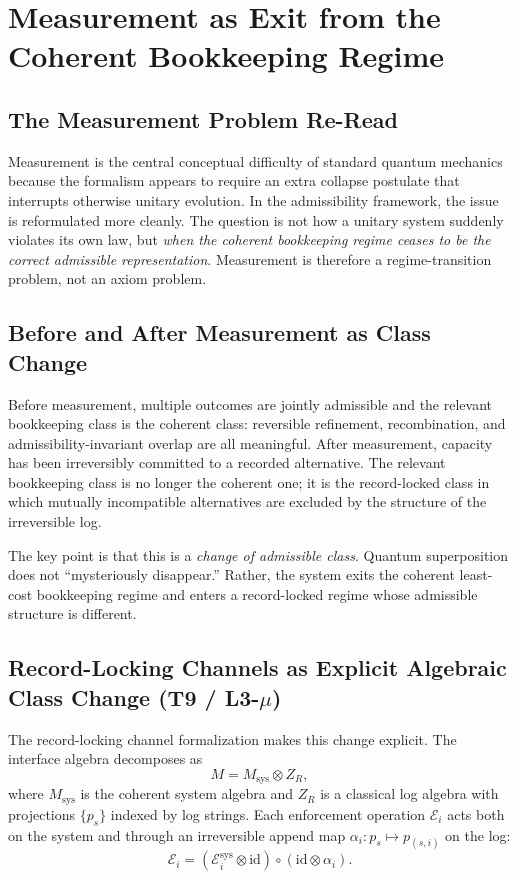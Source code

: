 \documentclass[11pt]{article}
\begin{document}
\section{Measurement as Exit from the Coherent Bookkeeping Regime}\label{sec:measurement}

\subsection{The Measurement Problem Re-Read}
Measurement is the central conceptual difficulty of standard quantum mechanics
because the formalism appears to require an extra collapse postulate that
interrupts otherwise unitary evolution. In the admissibility framework, the issue
is reformulated more cleanly. The question is not how a unitary system suddenly
violates its own law, but \emph{when the coherent bookkeeping regime ceases to be
the correct admissible representation}. Measurement is therefore a
regime-transition problem, not an axiom problem.

\subsection{Before and After Measurement as Class Change}
Before measurement, multiple outcomes are jointly admissible and the relevant
bookkeeping class is the coherent class: reversible refinement, recombination, and
admissibility-invariant overlap are all meaningful. After measurement, capacity
has been irreversibly committed to a recorded alternative. The relevant
bookkeeping class is no longer the coherent one; it is the record-locked class in
which mutually incompatible alternatives are excluded by the structure of the
irreversible log.

The key point is that this is a \emph{change of admissible class}. Quantum
superposition does not ``mysteriously disappear.'' Rather, the system exits the
coherent least-cost bookkeeping regime and enters a record-locked regime whose
admissible structure is different.

\subsection{Record-Locking Channels as Explicit Algebraic Class Change (T9 / L3-$\mu$)}
The record-locking channel formalization makes this change explicit. The
interface algebra decomposes as
\[
M = M_{\mathrm{sys}} \otimes Z_R,
\]
where $M_{\mathrm{sys}}$ is the coherent system algebra and $Z_R$ is a classical
log algebra with projections $\{p_s\}$ indexed by log strings. Each enforcement
operation $\mathcal{E}_i$ acts both on the system and through an irreversible
append map $\alpha_i: p_s \mapsto p_{(s,i)}$ on the log:
\[
\mathcal{E}_i = (\mathcal{E}_i^{\mathrm{sys}} \otimes \mathrm{id}) \circ
(\mathrm{id} \otimes \alpha_i).
\]
\end{document}
